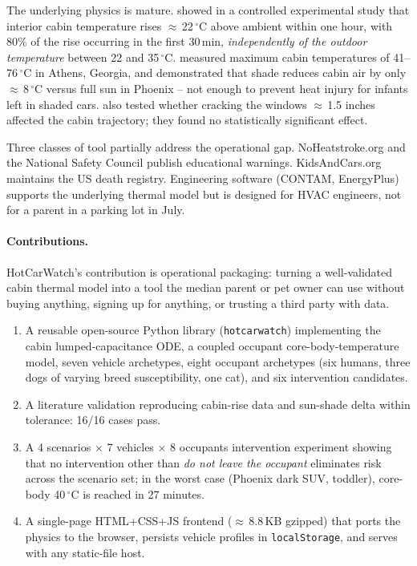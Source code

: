\documentclass[10pt,twocolumn]{article}
\begin{document}
The underlying physics is mature.
\citet{mclaren2005pediatrics} showed in a controlled experimental
study that interior cabin temperature rises $\approx$\,22\,$^\circ$C
above ambient within one hour, with 80\% of the rise occurring in
the first 30\,min, \emph{independently of the outdoor temperature}
between 22 and 35\,$^\circ$C.
\citet{grundstein2009ijb} measured maximum cabin temperatures of
41--76\,$^\circ$C in Athens, Georgia, and
\citet{vanos2018temperature} demonstrated that shade reduces cabin
air by only $\approx$\,8\,$^\circ$C versus full sun in Phoenix --
not enough to prevent heat injury for infants left in shaded cars.
\citet{mclaren2005pediatrics} also tested whether cracking the
windows $\approx$\,1.5 inches affected the cabin trajectory; they
found no statistically significant effect.

Three classes of tool partially address the operational gap.
NoHeatstroke.org and the National Safety Council publish
educational warnings.  KidsAndCars.org maintains the US death
registry.  Engineering software (CONTAM, EnergyPlus) supports the
underlying thermal model but is designed for HVAC engineers, not
for a parent in a parking lot in July.

\paragraph{Contributions.}
HotCarWatch's contribution is operational packaging: turning a
well-validated cabin thermal model into a tool the median parent
or pet owner can use without buying anything, signing up for
anything, or trusting a third party with data.

\begin{enumerate}\setlength{\itemsep}{0pt}
\item A reusable open-source Python library
(\texttt{hotcarwatch}) implementing the cabin lumped-capacitance
ODE, a coupled occupant core-body-temperature model, seven vehicle
archetypes, eight occupant archetypes (six humans, three dogs of
varying breed susceptibility, one cat), and six intervention
candidates.
\item A literature validation reproducing
\citet{mclaren2005pediatrics} cabin-rise data and
\citet{vanos2018temperature} sun-shade delta within tolerance:
16/16 cases pass.
\item A 4 scenarios $\times$ 7 vehicles $\times$ 8 occupants
intervention experiment showing that no intervention other than
\emph{do not leave the occupant} eliminates risk across the
scenario set; in the worst case (Phoenix dark SUV, toddler),
core-body 40\,$^\circ$C is reached in 27 minutes.
\item A single-page HTML+CSS+JS frontend ($\approx$\,8.8\,KB
gzipped) that ports the physics to the browser, persists vehicle
profiles in \texttt{localStorage}, and serves with any static-file
host.
\end{enumerate}
\end{document}
